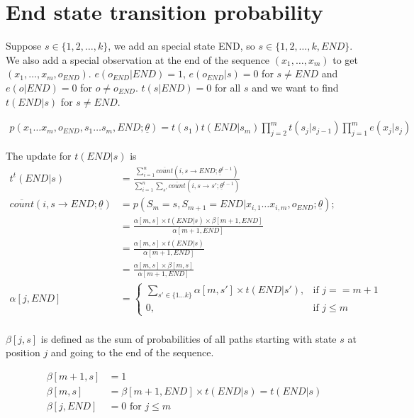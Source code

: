 \chapter{End state transition probability}

Suppose $s\in \{1, 2, \ldots, k\}$, we add an special state END, so 
$s\in \{1, 2, \ldots, k, END \}$. We also add a special observation at the end
of the sequence $(x_1, \ldots, x_m)$ to get $(x_1, \ldots, x_m, o_{END})$. 
$e(o_{END} | END) = 1$, $e(o_{END} | s) = 0$ for $s\neq END$ and $e(o | END) = 0$
for $o \neq o_{END}$. $t(s | END) = 0$ for all $s$ and we want to find $t(END | s)$ for
$s\neq END$.

\begin{align}
p(x_1\ldots x_m, o_{END}, s_1\ldots s_m, END;\underline{\theta}) = 
    t(s_1)t(END|s_m)\prod_{j = 2}^m t(s_j | s_{j-1})\prod_{j = 1}^m e(x_j|s_j)
\end{align} 

The update for $t(END|s)$ is
\begin{align}
t^t(END|s) &= \frac{\sum_{i = 1}^n \overline{count}(i, s\rightarrow END;\underline{\theta}^{t-1})}
    {\sum_{i = 1}^n\sum_{s'} \overline{count}(i, s\rightarrow s';\underline{\theta}^{t-1})} \\
\overline{count}(i, s\rightarrow END;\underline{\theta}) &= p(S_m = s, S_{m + 1} = END | x_{i, 1}\ldots x_{i, m}, o_{END}; \underline{\theta});\\
    &= \frac{\alpha[m, s]\times t(END|s)\times \beta[m + 1, END]}{\alpha[m + 1, END]}\\
    &= \frac{\alpha[m, s]\times t(END|s)}{\alpha[m + 1, END]}\\
    &= \frac{\alpha[m, s]\times \beta[m, s]}{\alpha[m + 1, END]}\\
\alpha[j, END] &= 
\begin{cases}
\sum_{s'\in\{1\ldots k\}}\alpha[m, s']\times t(END|s'), & \text{if } j == m + 1 \\
0, & \text{if } j\leq m
\end{cases} \\
\end{align}

$\beta[j, s]$ is defined as the sum of probabilities of all paths starting with 
state $s$ at position $j$ and going to the end of the sequence.

\begin{align}
\beta[m + 1, s] &= 1 \\
\beta[m, s] &= \beta[m + 1, END]\times t(END | s) = t(END | s) \\
\beta[j, END] &= 0 \text{ for } j \leq m
\end{align}


